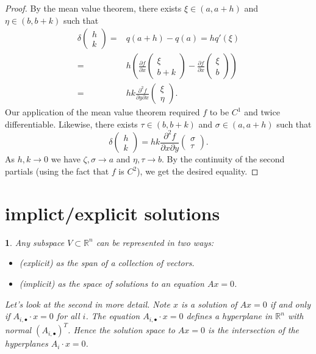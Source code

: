 \documentclass[12pt]{article}
\newtheorem{para}[theorem]{}
\begin{document}
\begin{proof}
	By the mean value theorem, there exists $\xi\in (a,a+h)$ and $\eta\in (b,b+k)$ such that 
	\begin{align*}
		\delta\begin{pmatrix}h\\k \end{pmatrix}
		=& q(a+h)-q(a) = hq'(\xi) \\
		=& h\left(\frac{\partial f}{\partial x}\begin{pmatrix}\xi \\ b+k\end{pmatrix} - \frac{\partial f}{\partial x}\begin{pmatrix}\xi \\ b\end{pmatrix}\right) \\
		=& hk \frac{\partial^2f}{\partial y\partial x}\begin{pmatrix}\xi \\ \eta\end{pmatrix}.
	\end{align*}
	Our application of the mean value theorem required $f$ to be $C^1$ and twice differentiable. Likewise, there exists $\tau\in (b,b+k)$ and $\sigma\in (a,a+h)$ such that 
	\begin{equation*}
		\delta\begin{pmatrix}h\\ k\end{pmatrix} = hk\frac{\partial^2f}{\partial x\partial y}\begin{pmatrix}\sigma \\ \tau\end{pmatrix}.
	\end{equation*}
	As $h,k\to 0$ we have $\zeta,\sigma\to a$ and $\eta,\tau\to b$. By the continuity of the second partials (using the fact that $f$ is $C^2$), we get the desired equality.
\end{proof}	



\section{implict/explicit solutions} %

\begin{para} 
	Any subspace $V\subset\mathbb{R}^n$ can be represented in two ways: 
	\begin{itemize}
		\item (explicit) as the span of a collection of vectors.
		\item (implicit) as the space of solutions to an equation $Ax=0$.
	\end{itemize}
	Let's look at the second in more detail. Note $x$ is a solution of $Ax=0$ if and only if $A_{i,\bullet}\cdot x=0$ for all $i$. The equation $A_{i,\bullet}\cdot x=0$ defines a hyperplane in $\mathbb{R}^n$ with normal $(A_{i,\bullet})^T$. Hence the solution space to $Ax=0$ is the intersection of the hyperplanes $A_i\cdot x=0$.
\end{para}	
\end{document}
